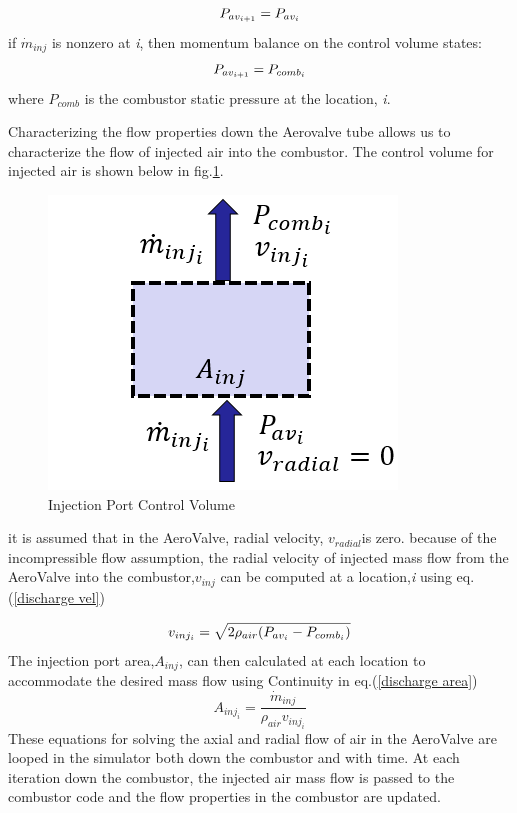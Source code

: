 \begin{equation}
    \centering
    P_{av_{i+1}}=P_{av_{i}}
\end{equation}
if \(\dot{m}_{inj}\) is nonzero at \textit{i}, then momentum balance on the control volume states:
\begin{equation}
    \centering
    P_{av_{i+1}}=P_{comb_{i}}
    \label{bypass pressure 1}
\end{equation}
where \(P_{comb}\) is the combustor static pressure at the location, \textit{i}.

Characterizing the flow properties down the Aerovalve tube allows us to characterize the flow of injected air into the combustor. The control volume for injected air is shown below in fig.\ref{fig:AeroValveInjectionCV}.

\begin{figure}[H]
 \centering
    \includegraphics[width=0.5\linewidth]{AeroValve_Figures/AeroValveInjectionCV.PNG}
    \caption{Injection Port Control Volume}
    \label{fig:AeroValveInjectionCV}
\end{figure}
it is assumed that in the AeroValve, radial velocity, \(v_{radial}\)is zero. because of the incompressible flow assumption, the radial velocity of injected mass flow from the AeroValve into the combustor,\(v_{inj}\) can be computed at a location,\textit{i} using eq.(\ref{discharge vel})

\begin{equation}
    \centering
    v_{inj_{i}}=\sqrt{2\rho_{air}(P_{av_i}-P_{comb_i})}
    \label{discharge vel}
\end{equation}
The injection port area,\(A_{inj}\), can then calculated at each location to accommodate the desired mass flow using Continuity in eq.(\ref{discharge area})
\begin{equation}
    A_{inj_i}=\frac{\dot{m}_{inj}}{\rho_{air}v_{inj_i}}
    \label{discharge area}
\end{equation}
These equations for solving the axial and radial flow of air in the AeroValve are looped in the simulator both down the combustor and with time. At each iteration down the combustor, the injected air mass flow is passed to the combustor code and the flow properties in the combustor are updated.

